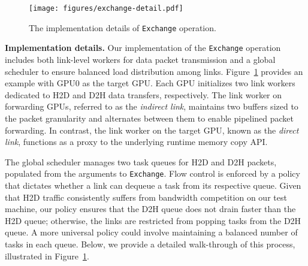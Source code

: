 \begin{comment}
We abstract a key primitive, \texttt{Exchange}, based on the above observations, as illustrated in Figure~\ref{fig:io-primitive-interface}.
An exchange operation asynchronously moves some CPU data to the target GPU and simultaneously downloads some data from the target GPU to the CPU, pipelined at a certain packet size granularity.
This operation schedules H2D and D2H data movements together, making it possible for the underlying scheduler to bear both in mind and perform flow control.
Unlike classic \texttt{Memcpy} APIs provided by runtimes, our interface does not require the destination and source to be a continuous chunk of memory, as long as their size is the same.
The application can, for example, copy 4 chunks of 2 GB data from CPU DRAM to an 8 GB region on GPU memory.

\texttt{Exchange} uplifts the job of CPU-GPU data movement from native runtime API to a library component.
The rationale behind such design decisions is similar to why databases tend to maintain their own buffer pools instead of using lower-level \texttt{mmap}, and why collective communication primitives are maintained by both NVIDIA (NCCL) and AMD (RCCL) officially.
\end{comment}

\begin{figure}[t]
    \centering
    \texttt{[image: figures/exchange-detail.pdf]}
    \caption{The implementation details of \texttt{Exchange} operation.}
    \label{fig:exchange-details}
\end{figure}


\noindent
\textbf{Implementation details.}
Our implementation of the \texttt{Exchange} operation includes both link-level workers for data packet transmission and a global scheduler to ensure balanced load distribution among links.
Figure~\ref{fig:exchange-details} provides an example with GPU0 as the target GPU. 
Each GPU initializes two link workers dedicated to H2D and D2H data transfers, respectively.
The link worker on forwarding GPUs, referred to as the \textit{indirect link}, maintains two buffers sized to the packet granularity and alternates between them to enable pipelined packet forwarding.
In contrast, the link worker on the target GPU, known as the \textit{direct link}, functions as a proxy to the underlying runtime memory copy API.

The global scheduler manages two task queues for H2D and D2H packets, populated from the arguments to \texttt{Exchange}. 
Flow control is enforced by a policy that dictates whether a link can dequeue a task from its respective queue. 
Given that H2D traffic consistently suffers from bandwidth competition on our test machine, our policy ensures that the D2H queue does not drain faster than the H2D queue; otherwise, the links are restricted from popping tasks from the D2H queue.
A more universal policy could involve maintaining a balanced number of tasks in each queue.
Below, we provide a detailed walk-through of this process, illustrated in Figure~\ref{fig:exchange-details}.


